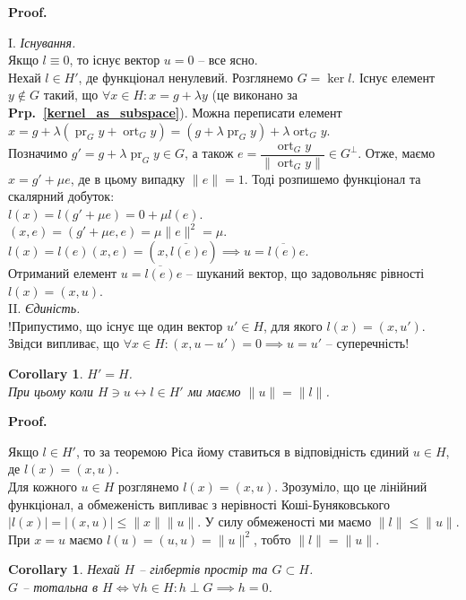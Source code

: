 \documentclass[a4paper, 10pt]{article}
\makeatletter
\theoremstyle{theoremdd}
\theoremstyle{theoremdd}
\theoremstyle{theoremdd}
\theoremstyle{theoremdd}
\theoremstyle{theoremdd}
\theoremstyle{theoremdd}
\theoremstyle{theoremdd}
\theoremstyle{theoremdd}
\newtheorem{corollary}[theorem]{Corollary}
\newcommand\prpref[1]{\textbf{Prp.~\ref{#1}}}
\DeclareMathOperator{\ort}{ort}
\DeclareMathOperator{\pr}{pr}
\renewenvironment{proof}[1][Proof.\\]{\par
\pushQED{\hfill \qed}%
\normalfont \topsep6\p@\@plus6\p@\relax
\trivlist
\item\relax
{\bfseries
#1\@addpunct{.}}\hspace\labelsep\ignorespaces
}{%
\popQED\endtrivlist\@endpefalse
}
\makeatother
\begin{document}
\begin{proof}
I. \textit{Існування.}\\
Якщо $l \equiv 0$, то існує вектор $u = 0$ -- все ясно.\\
Нехай $l \in H'$, де функціонал ненулевий. Розглянемо $G = \ker l$. Існує елемент $y \notin G$ такий, що $\forall x \in H: x = g + \lambda y$ (це виконано за \prpref{kernel_as_subspace}). Можна переписати елемент \\
$x = g + \lambda (\pr_G y + \ort_G y) = (g + \lambda \pr_G y) + \lambda \ort_G y$.\\
Позначимо $g' = g + \lambda \pr_G y \in G$, а також $e = \dfrac{\ort_G y}{\|\ort_G y\|} \in G^\perp$. Отже, маємо $x = g' + \mu e$, де в цьому випадку $\|e\| = 1$. Тоді розпишемо функціонал та скалярний добуток:\\
$l(x) = l(g'+\mu e) = 0 + \mu l(e)$.\\
$(x,e) = (g'+\mu e,e) = \mu \|e\|^2 = \mu$.\\
$l(x) = l(e)(x,e) = (x,\overline{l(e)}e) \implies u = \overline{l(e)}e$.\\
Отриманий елемент $u = \overline{l(e)}e$ -- шуканий вектор, що задовольняє рівності $l(x) = (x,u)$.
\bigskip \\
II. \textit{Єдиність.}\\
!Припустимо, що існує ще один вектор $u' \in H$, для якого $l(x) = (x,u')$. Звідси випливає, що $\forall x \in H: (x,u-u') = 0 \implies u = u'$ -- суперечність!
\end{proof}

\begin{corollary}
$H' = H$.\\
При цьому коли $H \ni u \leftrightarrow l \in H'$ ми маємо $\|u\| = \|l\|$.
\end{corollary}

\begin{proof}
Якщо $l \in H'$, то за теоремою Ріса йому ставиться в відповідність єдиний $u \in H$, де $l(x) = (x,u)$.\\
Для кожного $u \in H$ розглянемо $l(x) = (x,u)$. Зрозуміло, що це лінійний функціонал, а обмеженість випливає з нерівності Коші-Буняковського $|l(x)| = |(x,u)| \leq \|x\| \|u\|$. У силу обмеженості ми маємо $\|l\| \leq \|u\|$. При $x = u$ маємо $l(u) = (u,u) = \|u\|^2$, тобто $\|l\| = \|u\|$.
\end{proof}

\begin{corollary}
Нехай $H$ -- гілбертів простір та $G \subset H$.\\
$G$ -- тотальна в $H \iff \forall h \in H: h \perp G \implies h = 0$.
\end{corollary}
\end{document}
